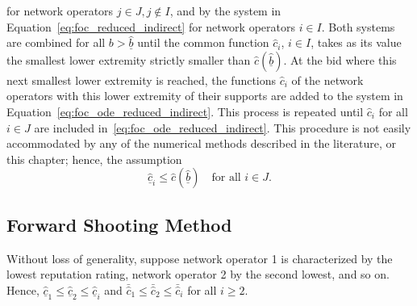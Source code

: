 for network operators $j\in J, j\not\in I$, and by the system in Equation~\eqref{eq:foc_reduced_indirect} for network operators $i\in I$. Both systems are combined for all $b > \underline{\hat{b}}$ until the common function $\hat{c}_i$, $i\in I$, takes as its value the smallest lower extremity strictly smaller than $\hat{c}(\underline{\hat{b}})$. At the bid where this next smallest lower extremity is reached, the functions $\hat{c}_i$ of the network operators with this lower extremity of their supports are added to the system in Equation~\eqref{eq:foc_ode_reduced_indirect}. This process is repeated until $\hat{c}_i$ for all $i\in J$ are included in~\eqref{eq:foc_ode_reduced_indirect}. This procedure is not easily accommodated by any of the numerical methods described in the literature, or this chapter; hence, the assumption
\begin{equation*}
  \underline{\hat{c}}_i \leq \hat{c}(\underline{\hat{b}}) \quad\text{for all } i\in J.
\end{equation*}

\subsection{Forward Shooting Method} %
\label{sub:forward_shooting_method_indirect}
Without loss of generality, suppose network operator 1 is characterized by the lowest reputation rating, network operator 2 by the second lowest, and so on. Hence, $\underline{\hat{c}}_1\leq \underline{\hat{c}}_2\leq \underline{\hat{c}}_i$ and $\bar{\hat{c}}_1\leq \bar{\hat{c}}_2\leq \bar{\hat{c}}_i$ for all $i\geq 2$.


